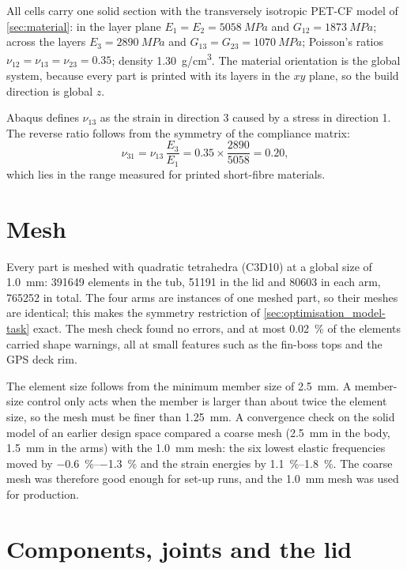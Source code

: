 All cells carry one solid section with the transversely isotropic PET-CF model of \cref{sec:material}: in the layer plane $E_1 = E_2 = \SI{5058}{MPa}$ and $G_{12} = \SI{1873}{MPa}$; across the layers $E_3 = \SI{2890}{MPa}$ and $G_{13} = G_{23} = \SI{1070}{MPa}$; Poisson's ratios $\nu_{12} = \nu_{13} = \nu_{23} = 0.35$; density \SI{1.30}{g/cm^3}. The material orientation is the global system, because every part is printed with its layers in the $xy$ plane, so the build direction is global $z$.

Abaqus defines $\nu_{13}$ as the strain in direction 3 caused by a stress in direction 1. The reverse ratio follows from the symmetry of the compliance matrix:
\begin{equation}
\nu_{31} = \nu_{13}\,\frac{E_3}{E_1} = 0.35 \times \frac{2890}{5058} = 0.20,
\end{equation}
which lies in the range measured for printed short-fibre materials.

\section{Mesh}\label{sec:optimisation_model-mesh}

Every part is meshed with quadratic tetrahedra (C3D10) at a global size of \SI{1.0}{mm}: \num{391649} elements in the tub, \num{51191} in the lid and \num{80603} in each arm, \num{765252} in total. The four arms are instances of one meshed part, so their meshes are identical; this makes the symmetry restriction of \cref{sec:optimisation_model-task} exact. The mesh check found no errors, and at most \SI{0.02}{\percent} of the elements carried shape warnings, all at small features such as the fin-boss tops and the GPS deck rim.

The element size follows from the minimum member size of \SI{2.5}{mm}. A member-size control only acts when the member is larger than about twice the element size, so the mesh must be finer than \SI{1.25}{mm}. A convergence check on the solid model of an earlier design space compared a coarse mesh (\SI{2.5}{mm} in the body, \SI{1.5}{mm} in the arms) with the \SI{1.0}{mm} mesh: the six lowest elastic frequencies moved by \SIrange{-0.6}{-1.3}{\percent} and the strain energies by \SIrange{1.1}{1.8}{\percent}. The coarse mesh was therefore good enough for set-up runs, and the \SI{1.0}{mm} mesh was used for production.

\section{Components, joints and the lid}\label{sec:optimisation_model-connections}

